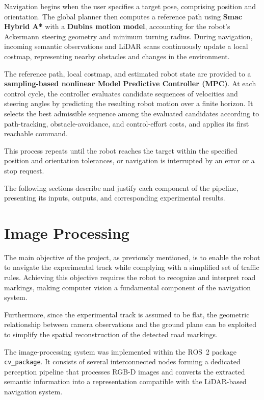 \documentclass[a4paper,11pt,oneside]{book}
\begin{document}
Navigation begins when the user specifies a target pose, comprising
position and orientation. The global planner then computes a
reference path using \textbf{Smac Hybrid A*} with a
\textbf{Dubins motion model}, accounting for the robot's Ackermann
steering geometry and minimum turning radius. During navigation,
incoming semantic observations and LiDAR scans continuously update
a local costmap, representing nearby obstacles and changes in
the environment.

The reference path, local costmap, and estimated robot state are
provided to a \textbf{sampling-based nonlinear Model Predictive
Controller (MPC)}. At each control cycle, the controller evaluates
candidate sequences of velocities and steering angles by predicting
the resulting robot motion over a finite horizon. It selects the
best admissible sequence among the evaluated candidates according
to path-tracking, obstacle-avoidance, and control-effort costs,
and applies its first reachable command.

This process repeats until the robot reaches the target within
the specified position and orientation tolerances, or navigation
is interrupted by an error or a stop request.

The following sections describe and justify each component of
the pipeline, presenting its inputs, outputs, and corresponding
experimental results.

\section{Image Processing}
\label{sec:computer_vision_pipeline}

The main objective of the project, as previously mentioned, is to
enable the robot to navigate the experimental track while complying
with a simplified set of traffic rules. Achieving this objective
requires the robot to recognize and interpret road markings, making
computer vision a fundamental component of the navigation system.

Furthermore, since the experimental track is assumed to be flat,
the geometric relationship between camera observations and the
ground plane can be exploited to simplify the spatial reconstruction
of the detected road markings.

The image-processing system was implemented within the ROS~2 package
\texttt{cv\_package}. It consists of several interconnected nodes
forming a dedicated perception pipeline that processes RGB-D images
and converts the extracted semantic information into a representation
compatible with the LiDAR-based navigation system.
\end{document}
